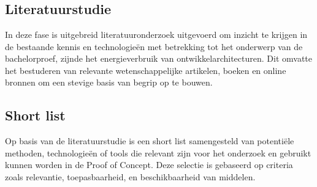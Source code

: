 
\chapter{}%
\label{ch:methodologie}

\section{Literatuurstudie}
In deze fase is uitgebreid literatuuronderzoek uitgevoerd om inzicht te krijgen in de bestaande kennis en technologieën met betrekking tot het onderwerp van de bachelorproef, zijnde het energieverbruik van ontwikkelarchitecturen. Dit omvatte het bestuderen van relevante wetenschappelijke artikelen, boeken en online bronnen om een stevige basis van begrip op te bouwen.


\section{Short list}
Op basis van de literatuurstudie is een short list samengesteld van potentiële methoden, technologieën of tools die relevant zijn voor het onderzoek en gebruikt kunnen worden in de Proof of Concept. Deze selectie is gebaseerd op criteria zoals relevantie, toepasbaarheid, en beschikbaarheid van middelen.


